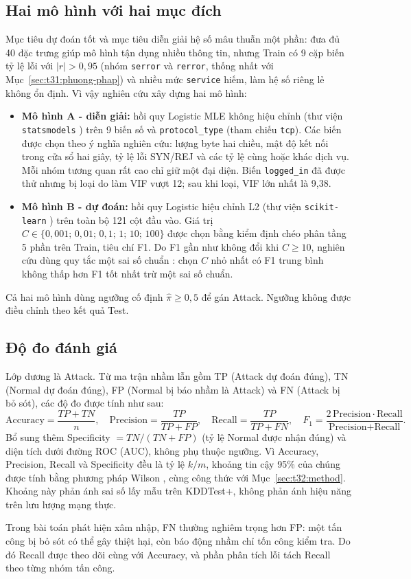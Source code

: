 \documentclass[../main.tex]{subfiles}
\begin{document}
\subsection{Hai mô hình với hai mục đích}
Mục tiêu dự đoán tốt và mục tiêu diễn giải hệ số mâu thuẫn một phần: đưa đủ 40 đặc trưng giúp mô hình tận dụng nhiều thông tin, nhưng Train có 9 cặp biến tỷ lệ lỗi với $|r|>0{,}95$ (nhóm \texttt{serror} và \texttt{rerror}, thống nhất với Mục~\ref{sec:t31:phuong-phap}) và nhiều mức \texttt{service} hiếm, làm hệ số riêng lẻ không ổn định. Vì vậy nghiên cứu xây dựng hai mô hình:
\begin{itemize}[leftmargin=1.2cm,itemsep=2pt]
\item \textbf{Mô hình A - diễn giải:} hồi quy Logistic MLE không hiệu chỉnh (thư viện \texttt{statsmodels} \cite{task4_statsmodels2010}) trên 9 biến số và \texttt{protocol\_type} (tham chiếu \texttt{tcp}). Các biến được chọn theo ý nghĩa nghiên cứu: lượng byte hai chiều, mật độ kết nối trong cửa sổ hai giây, tỷ lệ lỗi SYN/REJ và các tỷ lệ cùng hoặc khác dịch vụ. Mỗi nhóm tương quan rất cao chỉ giữ một đại diện. Biến \texttt{logged\_in} đã được thử nhưng bị loại do làm VIF vượt 12; sau khi loại, VIF lớn nhất là 9,38.
\item \textbf{Mô hình B - dự đoán:} hồi quy Logistic hiệu chỉnh L2 (thư viện \texttt{scikit-learn} \cite{task4_sklearn2011}) trên toàn bộ 121 cột đầu vào. Giá trị $C\in\{0{,}001;\,0{,}01;\,0{,}1;\,1;\,10;\,100\}$ được chọn bằng kiểm định chéo phân tầng 5 phần trên Train, tiêu chí F1. Do F1 gần như không đổi khi $C\geq10$, nghiên cứu dùng quy tắc một sai số chuẩn \cite{task4_hastie2009}: chọn $C$ nhỏ nhất có F1 trung bình không thấp hơn F1 tốt nhất trừ một sai số chuẩn.
\end{itemize}
Cả hai mô hình dùng ngưỡng cố định $\hat\pi\geq0{,}5$ để gán Attack. Ngưỡng không được điều chỉnh theo kết quả Test.

\subsection{Độ đo đánh giá}
Lớp dương là Attack. Từ ma trận nhầm lẫn gồm TP (Attack dự đoán đúng), TN (Normal dự đoán đúng), FP (Normal bị báo nhầm là Attack) và FN (Attack bị bỏ sót), các độ đo được tính như sau:
\begin{equation}
\text{Accuracy}=\frac{TP+TN}{n},\quad
\text{Precision}=\frac{TP}{TP+FP},\quad
\text{Recall}=\frac{TP}{TP+FN},\quad
F_1=\frac{2\,\text{Precision}\cdot\text{Recall}}{\text{Precision}+\text{Recall}}.
\label{eq:t4:metrics}
\end{equation}
Bổ sung thêm Specificity $=TN/(TN+FP)$ (tỷ lệ Normal được nhận đúng) và diện tích dưới đường ROC (AUC), không phụ thuộc ngưỡng. Vì Accuracy, Precision, Recall và Specificity đều là tỷ lệ $k/m$, khoảng tin cậy 95\% của chúng được tính bằng phương pháp Wilson \cite{task4_wilson1927}, cùng công thức với Mục~\ref{sec:t32:method}. Khoảng này phản ánh sai số lấy mẫu trên KDDTest+, không phản ánh hiệu năng trên lưu lượng mạng thực.

Trong bài toán phát hiện xâm nhập, FN thường nghiêm trọng hơn FP: một tấn công bị bỏ sót có thể gây thiệt hại, còn báo động nhầm chỉ tốn công kiểm tra. Do đó Recall được theo dõi cùng với Accuracy, và phần phân tích lỗi tách Recall theo từng nhóm tấn công.
\FloatBarrier
\end{document}
